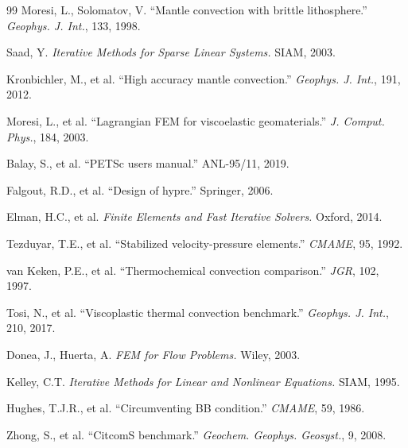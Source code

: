 \documentclass[11pt,a4paper]{ctexart}
\begin{document}
\begin{thebibliography}{99}
 Moresi, L., Solomatov, V. ``Mantle convection with brittle lithosphere.'' \textit{Geophys. J. Int.}, 133, 1998.

 Saad, Y. \textit{Iterative Methods for Sparse Linear Systems.} SIAM, 2003.

 Kronbichler, M., et al. ``High accuracy mantle convection.'' \textit{Geophys. J. Int.}, 191, 2012.

 Moresi, L., et al. ``Lagrangian FEM for viscoelastic geomaterials.'' \textit{J. Comput. Phys.}, 184, 2003.

 Balay, S., et al. ``PETSc users manual.'' ANL-95/11, 2019.

 Falgout, R.D., et al. ``Design of hypre.'' Springer, 2006.

 Elman, H.C., et al. \textit{Finite Elements and Fast Iterative Solvers.} Oxford, 2014.

 Tezduyar, T.E., et al. ``Stabilized velocity-pressure elements.'' \textit{CMAME}, 95, 1992.

 van Keken, P.E., et al. ``Thermochemical convection comparison.'' \textit{JGR}, 102, 1997.

 Tosi, N., et al. ``Viscoplastic thermal convection benchmark.'' \textit{Geophys. J. Int.}, 210, 2017.

 Donea, J., Huerta, A. \textit{FEM for Flow Problems.} Wiley, 2003.

 Kelley, C.T. \textit{Iterative Methods for Linear and Nonlinear Equations.} SIAM, 1995.

 Hughes, T.J.R., et al. ``Circumventing BB condition.'' \textit{CMAME}, 59, 1986.

 Zhong, S., et al. ``CitcomS benchmark.'' \textit{Geochem. Geophys. Geosyst.}, 9, 2008.

\end{thebibliography}
\end{document}

